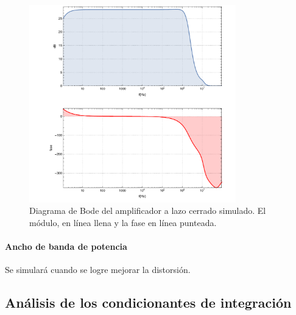 \documentclass[a4paper,12pt,twoside]{article}
\begin{document}
\begin{figure}[H]
	\centering
	\includegraphics[width=0.8\textwidth]{img/sim/bode}
	\caption{Diagrama de Bode del amplificador a lazo cerrado simulado. El módulo, en línea llena y la fase en línea punteada.}
	\label{fig:bode}
\end{figure}




\paragraph{Ancho de banda de potencia}

Se simulará cuando se logre mejorar la distorsión.


\subsection{Análisis de los condicionantes de integración}







\end{document}
